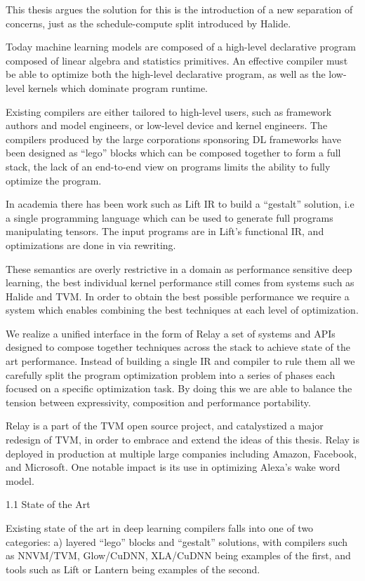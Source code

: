 This thesis argues the solution for this is the introduction of a new separation of concerns, just as the schedule-compute split introduced by Halide.

Today machine learning models are composed of a high-level declarative program composed of linear algebra and statistics primitives. An effective compiler must be able to optimize both the high-level declarative program, as well as the low-level kernels which dominate program runtime.

Existing compilers are either tailored to high-level users, such as framework authors and model engineers, or low-level device and kernel engineers. The compilers produced by the large corporations sponsoring DL frameworks have been designed as “lego” blocks which can be composed together to form a full stack, the lack of an end-to-end view on programs limits the ability to fully optimize the program.

In academia there has been work such as Lift IR to build a “gestalt” solution, i.e a single programming language which can be used to generate full programs manipulating tensors.
The input programs are in Lift’s functional IR, and optimizations are done in via rewriting.

These semantics are overly restrictive in a domain as performance sensitive deep learning, the best individual kernel performance still comes from systems such as Halide and TVM.  In order to obtain the best possible performance we require a system which enables combining the best techniques at each level of optimization.

We realize a unified interface in the form of Relay a set of systems and APIs designed to compose together techniques across the stack to achieve state of the art performance.
Instead of building a single IR and compiler to rule them all we carefully split the program optimization problem into a series of phases each focused on a specific optimization task.
By doing this we are able to balance the tension between expressivity, composition and performance portability.

Relay is a part of the TVM open source project, and catalystized a major redesign of TVM, in order to embrace and extend the ideas of this thesis. Relay is deployed in production at multiple large companies including Amazon, Facebook, and Microsoft. One notable impact is its use in optimizing Alexa’s wake word model.

1.1 State of the Art

Existing state of the art in deep learning compilers falls into one of two categories: a) layered “lego” blocks and “gestalt” solutions, with compilers such as NNVM/TVM, Glow/CuDNN, XLA/CuDNN being examples of the first, and tools such as Lift or Lantern being examples of the second.

